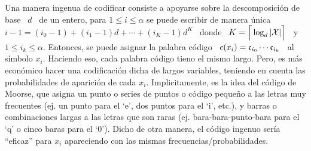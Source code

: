 Una manera ingenua de codificar consiste a apoyarse sobre la descomposici\'on de
base \ $d$  \ de un entero, \ie para  $1 \le i \le \alpha$  se puede escribir de
manera \'unica \ $i-1 = (i_0-1) + (i_1-1) d + \cdots + (i_K-1) d^K$ \ donde \ $K
= \Big\lceil \log_d |\mathcal{X}| \Big\rceil$ \ y \ $1 \le i_k \le \alpha$.  Entonces, se
puede asignar la palabra c\'odigo \ $c(x_i) = \mathfrak{c}_{i_0} \cdots \mathfrak{c}_{i_k}$ \ al
s\'imbolo  $x_i$.  Haciendo  eso, cada  palabra c\'odigo  tieno el  mismo largo.
Pero, es m\'as  econ\'omico hacer una codificaci\'on dicha  de largos variables,
teniendo   en  cuenta  las   probabilidades  de   aparici\'on  de   cada  $x_i$.
Implicitamente, es la idea del c\'odigo  de Moorse, que asigna un punto o series
de puntos o  c\'odigo peque\~no a las letras muy frecuentes  (ej.  un punto para
el `e',  dos puntos para el  `i', etc.), y  barras o combinaciones largas  a las
letras que son raras (ej. bara-bara-punto-bara para el `q' o cinco baras para el
`0').  Dicho de  otra manera, el c\'odigo ingenuo  ser\'ia ``eficaz'' para $x_i$
apareciendo con las mismas frecuencias/probabilidades.

